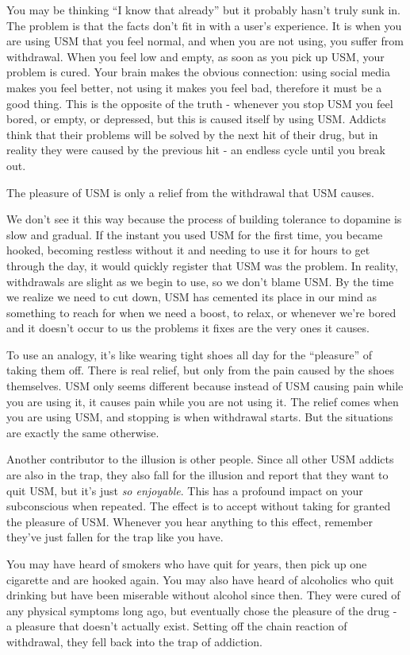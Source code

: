 \documentclass[
  openany]{book}
\begin{document}
You may be thinking ``I know that already'' but it probably hasn't truly sunk in. The problem is that the facts don't fit in with a user's experience. It is when you are using USM that you feel normal, and when you are not using, you suffer from withdrawal. When you feel low and empty, as soon as you pick up USM, your problem is cured. Your brain makes the obvious connection: using social media makes you feel better, not using it makes you feel bad, therefore it must be a good thing. This is the opposite of the truth - whenever you stop USM you feel bored, or empty, or depressed, but this is caused itself by using USM. Addicts think that their problems will be solved by the next hit of their drug, but in reality they were caused by the previous hit - an endless cycle until you break out.

The pleasure of USM is only a relief from the withdrawal that USM causes.

We don't see it this way because the process of building tolerance to dopamine is slow and gradual. If the instant you used USM for the first time, you became hooked, becoming restless without it and needing to use it for hours to get through the day, it would quickly register that USM was the problem. In reality, withdrawals are slight as we begin to use, so we don't blame USM. By the time we realize we need to cut down, USM has cemented its place in our mind as something to reach for when we need a boost, to relax, or whenever we're bored and it doesn't occur to us the problems it fixes are the very ones it causes.

To use an analogy, it's like wearing tight shoes all day for the ``pleasure'' of taking them off. There is real relief, but only from the pain caused by the shoes themselves. USM only seems different because instead of USM causing pain while you are using it, it causes pain while you are not using it. The relief comes when you are using USM, and stopping is when withdrawal starts. But the situations are exactly the same otherwise.

Another contributor to the illusion is other people. Since all other USM addicts are also in the trap, they also fall for the illusion and report that they want to quit USM, but it's just \emph{so enjoyable}. This has a profound impact on your subconscious when repeated. The effect is to accept without taking for granted the pleasure of USM. Whenever you hear anything to this effect, remember they've just fallen for the trap like you have.

You may have heard of smokers who have quit for years, then pick up one cigarette and are hooked again. You may also have heard of alcoholics who quit drinking but have been miserable without alcohol since then. They were cured of any physical symptoms long ago, but eventually chose the pleasure of the drug - a pleasure that doesn't actually exist. Setting off the chain reaction of withdrawal, they fell back into the trap of addiction.
\end{document}
